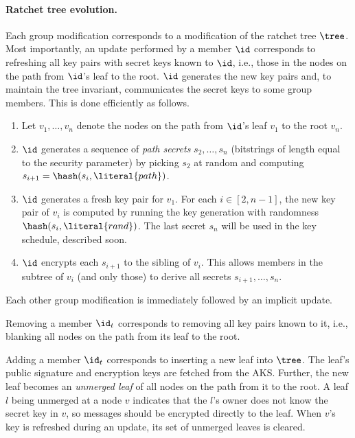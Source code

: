 
\paragraph{Ratchet tree evolution.}
Each group modification corresponds to a modification of the ratchet tree $\tree$. Most importantly, an update performed by a member $\id$ corresponds to refreshing all key pairs with secret keys known to $\id$, i.e., those in the nodes on the path from $\id$'s leaf to the root. $\id$ generates the new key pairs and, to maintain the tree invariant, communicates the secret keys to some group members. This is done efficiently as follows.
\begin{enumerate}[itemsep=0pt]
  \item Let $v_1, \dots, v_n$ denote the nodes on the path from $\id$'s leaf $v_1$ to the root $v_n$.
  \item $\id$ generates a sequence of \emph{path secrets} $s_2, \dots, s_n$ (bitstrings of length equal to the security parameter) by picking $s_2$ at random and computing $s_{i+1} = \hash(s_i,\literal{path})$.
  \item $\id$ generates a fresh key pair for $v_1$. For each $i\in[2,n-1]$, the new key pair of $v_i$ is computed by
    running the key generation with randomness $\hash(s_i,\literal{rand})$. The last secret $s_n$ will be used in the key schedule, described soon.
  \item $\id$ encrypts each $s_{i+1}$ to the sibling of $v_i$. This allows members in the subtree of $v_i$ (and only those) to derive all secrets $s_{i+1}, \dots, s_n$.
\end{enumerate}
Each other group modification is immediately followed by an implicit update.

Removing a member $\id_t$ corresponds to removing all key pairs known to it, i.e., blanking all nodes on the path from its leaf to the root.

Adding a member $\id_t$ corresponds to inserting a new leaf into $\tree$. The leaf's public signature and encryption keys are fetched from the AKS. Further, the new leaf becomes an \emph{unmerged leaf} of all nodes on the path from it to the root. A leaf $l$ being unmerged at a node $v$ indicates that the $l$'s owner does not know the secret key in $v$, so messages should be encrypted directly to the leaf. When $v$'s key is refreshed during an update, its set of unmerged leaves is cleared.

